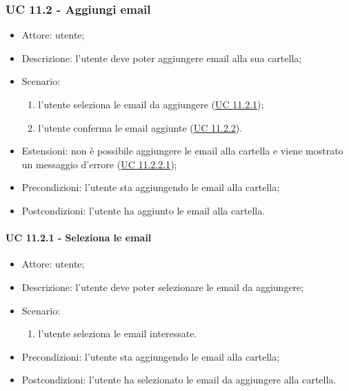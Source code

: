     \subsubsection{UC 11.2 - Aggiungi email} \label{sec: UC 11.2}
    \begin{itemize}
        \item Attore: utente;
        \item Descrizione: l'utente deve poter aggiungere email alla sua cartella;
        \item Scenario:
        \begin{enumerate}
        \item l'utente seleziona le email da aggiungere (\hyperref[sec: UC 11.2.1]{UC 11.2.1});
        \item l'utente conferma le email aggiunte (\hyperref[sec: UC 11.2.2]{UC 11.2.2}).
        \end{enumerate}
        \item Estensioni: non è possibile aggiungere le email alla cartella e viene mostrato un messaggio d'errore (\hyperref[sec: UC 11.2.2.1]{UC 11.2.2.1});
        \item Precondizioni: l'utente sta aggiungendo le email alla cartella;
        \item Postcondizioni: l'utente ha aggiunto le email alla cartella.
    \end{itemize}
    \paragraph{UC 11.2.1 - Seleziona le email} \label{sec: UC 11.2.1}
        \begin{itemize}
            \item Attore: utente;
            \item Descrizione: l'utente deve poter selezionare le email da aggiungere;
            \item Scenario:
            \begin{enumerate}
                \item l'utente seleziona le email interessate.
            \end{enumerate}
        \item Precondizioni: l'utente sta aggiungendo le email alla cartella;
        \item Postcondizioni: l'utente ha selezionato le email da aggiungere alla cartella.
    \end{itemize}
